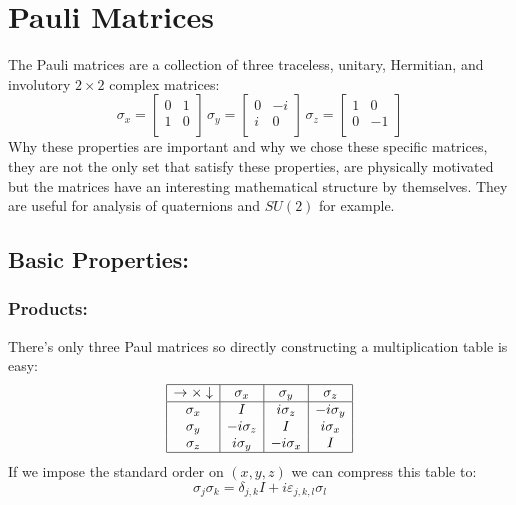
\section{Pauli Matrices}
The Pauli matrices are a collection of three traceless, unitary, Hermitian, and involutory $2\times2$ complex matrices:
\[
	\sigma_x = \begin{bmatrix}0&1\\1&0\\\end{bmatrix}\,
	\sigma_y = \begin{bmatrix}0&-i\\i&0\\\end{bmatrix}\,
	\sigma_z = \begin{bmatrix}1&0\\0&-1\\\end{bmatrix}
\]
Why these properties are important and why we chose these specific matrices,
they are not the only set that satisfy these properties,
are physically motivated but the matrices have an interesting mathematical structure by themselves.
They are useful for analysis of quaternions and $SU(2)$ for example.

\subsection{Basic Properties:}
\subsubsection{Products:}
There's only three Paul matrices so directly constructing a multiplication table is easy:
\[\begin{array}{|c|c|c|c|}
	\hline
	\rightarrow\times\downarrow&\sigma_x&\sigma_y&\sigma_z\\
	\hline
	\sigma_x&I&i\sigma_z&-i\sigma_y\\
	\sigma_y&-i\sigma_z&I&i\sigma_x\\
	\sigma_z&i\sigma_y&-i\sigma_x&I\\
	\hline
\end{array}\]
If we impose the standard order on $(x,y,z)$ we can compress this table to:
\[\sigma_j\sigma_k = \delta_{j,k}I+i\varepsilon_{j,k,l}\sigma_l\]


